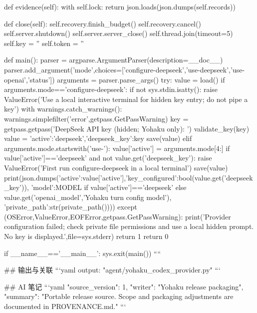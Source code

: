     def evidence(self):
        with self.lock:
            return json.loads(json.dumps(self.records))

    def close(self):
        self.recovery.finish_budget()
        self.recovery.cancel()
        self.server.shutdown()
        self.server.server_close()
        self.thread.join(timeout=5)
        self.key = ''
        self.token = ''


def main():
    parser = argparse.ArgumentParser(description=__doc__)
    parser.add_argument('mode',choices=['configure-deepseek','use-deepseek','use-openai','status'])
    arguments = parser.parse_args()
    try:
        value = load()
        if arguments.mode=='configure-deepseek':
            if not sys.stdin.isatty():
                raise ValueError('Use a local interactive terminal for hidden key entry; do not pipe a key')
            with warnings.catch_warnings():
                warnings.simplefilter('error',getpass.GetPassWarning)
                key = getpass.getpass('DeepSeek API key (hidden; Yohaku only): ')
            validate_key(key)
            value = {'active':'deepseek','deepseek_key':key}
            save(value)
        elif arguments.mode.startswith('use-'):
            value['active'] = arguments.mode[4:]
            if value['active']=='deepseek' and not value.get('deepseek_key'):
                raise ValueError('First run configure-deepseek in a local terminal')
            save(value)
        print(json.dumps({'active':value['active'],'key_configured':bool(value.get('deepseek_key')),
                          'model':MODEL if value['active']=='deepseek' else value.get('openai_model','Yohaku turn config model'),
                          'private_path':str(private_path())}))
    except (OSError,ValueError,EOFError,getpass.GetPassWarning):
        print('Provider configuration failed; check private file permissions and use a local hidden prompt. No key is displayed.',file=sys.stderr)
        return 1
    return 0


if __name__=='__main__':
    sys.exit(main())
````

## 输出与关联
```yaml
output: "agent/yohaku_codex_provider.py"
```

## AI 笔记
```yaml
{"source_version": 1, "writer": "Yohaku release packaging", "summary": "Portable release source. Scope and packaging adjustments are documented in PROVENANCE.md."}
```
